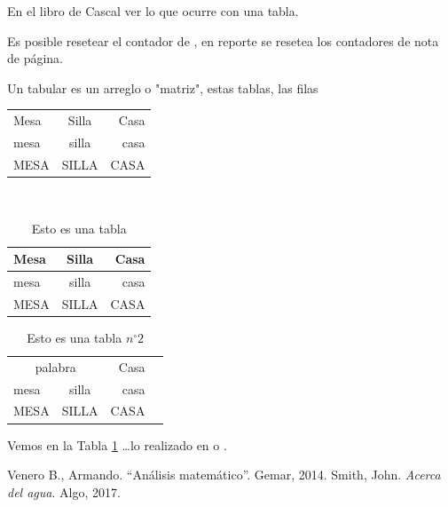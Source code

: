 \documentclass{article}
\begin{document}

En el libro de Cascal ver lo que ocurre con una tabla.

Es posible resetear el contador de , en reporte se resetea los contadores de nota de página.

Un tabular es un arreglo o "matriz", estas tablas, las filas\\[2cm]

\renewcommand{\spanishtablename}{Tablita}

\begin{tabular}{lcr}
	Mesa & Silla & Casa \\
	mesa & silla & casa \\
	MESA & SILLA & CASA
\end{tabular}

\ \\[2cm]
\begin{table}[H] %
\centering
\caption{Esto es una tabla}%
\begin{tabular}{|l|c|r|}
	\hline
	Mesa & Silla & Casa \\
	\hline
	mesa & silla & casa \\
	\hline
	MESA & SILLA & CASA \\
	\hline
\end{tabular}
\end{table}

\begin{table}[H] %
	\centering
	\caption{Esto es una tabla $n^{\circ}2$}\label{tab:2}%
	\begin{tabular}{|l|c|r|p{3cm}||}
		\hline
		\multicolumn{2}{|c|}{palabra} & Casa \\
		\cline{2-3}
		mesa & silla & casa \\
		\hline\hline
		MESA & SILLA & CASA\newline \\
		\hline
	\end{tabular}
\end{table}
Vemos en la Tabla \ref{tab:2} \ldots lo realizado en \cite{V14} o \cite{smi17}.
\begin{thebibliography}{99}
	 Venero B., Armando. ``Análisis matemático''. Gemar, 2014.
	 Smith, John. \emph{Acerca del agua}. Algo, 2017.
\end{thebibliography}
\newpage
\end{document}
